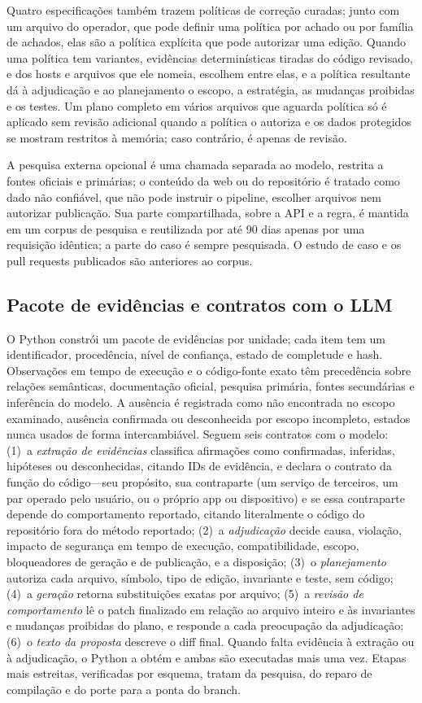 \documentclass[conference]{IEEEtran}
\begin{document}
Quatro especificações também trazem políticas de correção curadas; junto com
um arquivo do operador, que pode definir uma política por achado ou por família
de achados, elas são a política explícita que pode autorizar uma edição. Quando
uma política tem variantes, evidências determinísticas tiradas do código
revisado, e dos hosts e arquivos que ele nomeia, escolhem entre elas, e a
política resultante dá à adjudicação e ao planejamento o escopo, a estratégia,
as mudanças proibidas e os testes. Um plano completo em vários arquivos que
aguarda política só é aplicado sem revisão adicional quando a política o
autoriza e os dados protegidos se mostram restritos à memória; caso contrário,
é apenas de revisão.

A pesquisa externa opcional é uma chamada separada ao modelo, restrita a fontes
oficiais e primárias; o conteúdo da web ou do repositório é tratado como dado
não confiável, que não pode instruir o pipeline, escolher arquivos nem
autorizar publicação. Sua parte compartilhada, sobre a API e a regra, é mantida
em um corpus de pesquisa e reutilizada por até 90 dias apenas por uma
requisição idêntica; a parte do caso é sempre pesquisada. O estudo de caso e os
pull requests publicados são anteriores ao corpus.

\subsection{Pacote de evidências e contratos com o LLM}

O Python constrói um pacote de evidências por unidade; cada item tem um
identificador, procedência, nível de confiança, estado de completude e hash.
Observações em tempo de execução e o código-fonte exato têm precedência sobre
relações semânticas, documentação oficial, pesquisa primária, fontes
secundárias e inferência do modelo. A ausência é registrada como não
encontrada no escopo examinado, ausência confirmada ou desconhecida por escopo
incompleto, estados nunca usados de forma intercambiável. Seguem seis contratos
com o modelo:
(1)~a \emph{extração de evidências} classifica afirmações como confirmadas,
inferidas, hipóteses ou desconhecidas, citando IDs de evidência, e declara o
contrato da função do código---seu propósito, sua contraparte (um serviço de
terceiros, um par operado pelo usuário, ou o próprio app ou dispositivo) e se
essa contraparte depende do comportamento reportado, citando literalmente o
código do repositório fora do método reportado; (2)~a \emph{adjudicação} decide
causa, violação, impacto de segurança em tempo de execução, compatibilidade,
escopo, bloqueadores de geração e de publicação, e a disposição;
(3)~o \emph{planejamento} autoriza cada arquivo, símbolo, tipo de edição,
invariante e teste, sem código; (4)~a \emph{geração} retorna substituições
exatas por arquivo; (5)~a \emph{revisão de comportamento} lê o patch finalizado
em relação ao arquivo inteiro e às invariantes e mudanças proibidas do plano, e
responde a cada preocupação da adjudicação; (6)~o \emph{texto da proposta}
descreve o diff final. Quando falta evidência à extração ou à adjudicação, o
Python a obtém e ambas são executadas mais uma vez. Etapas mais
estreitas, verificadas por esquema, tratam da pesquisa, do reparo de compilação
e do porte para a ponta do branch.
\end{document}
